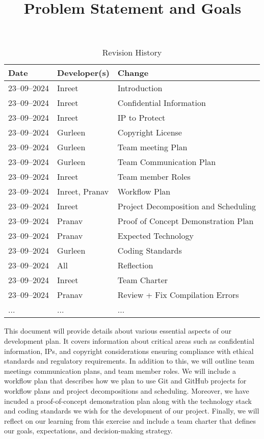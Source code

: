 \documentclass{article}
\title{Problem Statement and Goals\\\progname}
\author{\authname}
\date{}
\begin{document}
\maketitle

\begin{table}[hp]
\caption{Revision History} \label{TblRevisionHistory}
\begin{tabularx}{\textwidth}{llX}
\toprule
\textbf{Date} & \textbf{Developer(s)} & \textbf{Change}\\
\midrule
23--09--2024 & Inreet & Introduction\\
23--09--2024 & Inreet & Confidential Information\\
23--09--2024 & Inreet & IP to Protect\\
23--09--2024 & Gurleen & Copyright License\\
23--09--2024 & Gurleen & Team meeting Plan\\
23--09--2024 & Gurleen & Team Communication Plan\\
23--09--2024 & Inreet & Team member Roles\\
23--09--2024 & Inreet, Pranav & Workflow Plan\\
23--09--2024 & Inreet & Project Decomposition and Scheduling\\
23--09--2024 & Pranav & Proof of Concept Demonstration Plan\\
23--09--2024 & Pranav & Expected Technology\\
23--09--2024 & Gurleen & Coding Standards\\
23--09--2024 & All & Reflection\\
23--09--2024 & Inreet & Team Charter\\
23--09--2024 & Pranav & Review + Fix Compilation Errors\\
... & ... & ...\\
\bottomrule
\end{tabularx}
\end{table}

\newpage{}

This document will provide details about various essential aspects of our development plan. It covers information about critical areas such as confidential information, IPs, and copyright considerations ensuring compliance with ethical standards and regulatory requirements. In addition to this, we will outline team meetings communication plans, and team member roles. We will include a workflow plan that describes how we plan to use Git and GitHub projects for workflow plans and project decompositions and scheduling. Moreover, we have incuded a proof-of-concept demonstration plan along with the technology stack and coding standards we wish for the development of our project. Finally, we will reflect on our learning from this exercise and include a team charter that defines our goals, expectations, and decision-making strategy. 
\end{document}
